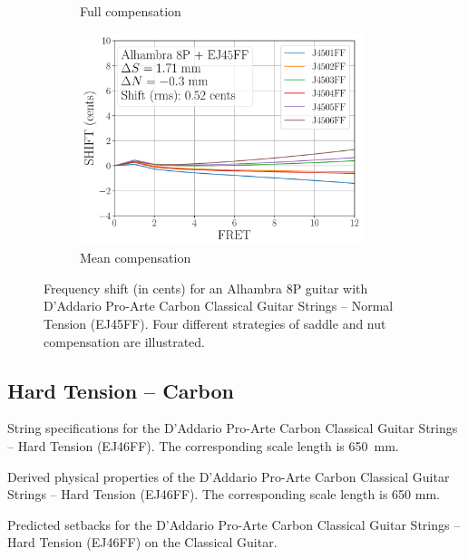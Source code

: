 \begin{figure}
\begin{subfigure}[b]{0.46\textwidth}
    \caption{Full compensation}
    \label{fig:shift_alhambra8p_ej45ff_full}
   \end{subfigure}
   \hspace{0.25in}
   \begin{subfigure}[b]{0.46\textwidth}
    \centering
    \includegraphics[width=3.25in]{../figures/shift_alhambra8p_ej45ff_mean}
    \caption{Mean compensation}
    \label{fig:shift_alhambra8p_ej45ff_mean}
   \end{subfigure}
   \caption{\label{fig:compensation_alhambra8p_ej45ff} Frequency shift (in cents) for an Alhambra 8P guitar with D'Addario Pro-Arte Carbon Classical Guitar Strings -- Normal Tension (EJ45FF). Four different strategies of saddle and nut compensation are illustrated.}
 \end{figure}
 
 \newpage
 \subsection{Hard Tension -- Carbon}
 
 \begin{table}[htbp]
   \centering
   \caption{\label{tbl:ej46ff_mks} String specifications for the D'Addario Pro-Arte Carbon Classical Guitar Strings -- Hard Tension (EJ46FF). The corresponding scale length is 650~mm.}
   
 \end{table}%
 
 \begin{table}[htbp]
   \centering
   \caption{\label{tbl:ej46ff_props} Derived physical properties of the D'Addario Pro-Arte Carbon Classical Guitar Strings -- Hard Tension (EJ46FF). The corresponding scale length is 650 mm.}
   
 \end{table}%
 
 \begin{table}[htbp]
   \centering
   \caption{\label{tbl:ej46ff_setbacks} Predicted setbacks for the D'Addario Pro-Arte Carbon Classical Guitar Strings -- Hard Tension (EJ46FF) on the Classical Guitar.}
   
 \end{table}%
 
